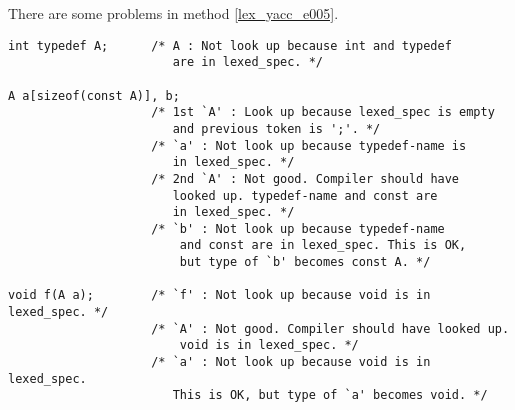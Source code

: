There are some problems in method \ref{lex_yacc_e005}.

\begin{verbatim}
int typedef A;      /* A : Not look up because int and typedef
                       are in lexed_spec. */

A a[sizeof(const A)], b;
                    /* 1st `A' : Look up because lexed_spec is empty
                       and previous token is ';'. */
                    /* `a' : Not look up because typedef-name is
                       in lexed_spec. */
                    /* 2nd `A' : Not good. Compiler should have
                       looked up. typedef-name and const are
                       in lexed_spec. */
                    /* `b' : Not look up because typedef-name
                        and const are in lexed_spec. This is OK,
                        but type of `b' becomes const A. */

void f(A a);        /* `f' : Not look up because void is in lexed_spec. */
                    /* `A' : Not good. Compiler should have looked up.
                        void is in lexed_spec. */
                    /* `a' : Not look up because void is in lexed_spec.
                       This is OK, but type of `a' becomes void. */
\end{verbatim}

